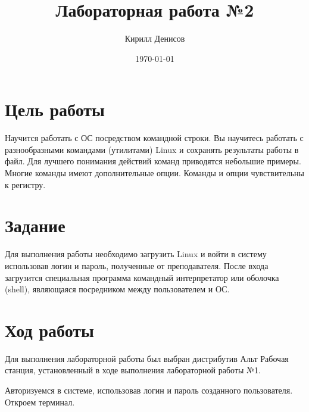 \documentclass[a4paper,14pt]{extarticle}
\author{Кирилл Денисов}
\title{Лабораторная работа №2}
\date{\today}
\newcommand{\pathToCommonFolder}{/home/denilai/Documents/repos/latex/Common}
\begin{document}
	\thispagestyle{empty}
	
	\newpage
	
\normalsize

\section*{Цель работы}
Научится работать с ОС
посредством командной строки. Вы научитесь работать с
разнообразными командами (утилитами) Linux и сохранять
результаты работы в файл. Для лучшего понимания действий
команд приводятся небольшие примеры. Многие команды имеют
дополнительные опции. Команды и опции чувствительны к
регистру.

\section*{Задание}
Для выполнения работы необходимо загрузить Linux и
войти в систему использовав логин и пароль, полученные от
преподавателя. После входа загрузится специальная программа
командный интерпретатор или оболочка (shell), являющаяся
посредником между пользователем и ОС. 


\section*{Ход работы}

Для выполнения лабораторной работы был выбран дистрибутив Альт Рабочая станция, установленный в ходе выполнения лабораторной работы №1. 

Авторизуемся в системе, использовав логин и пароль созданного пользователя. Откроем терминал.
\end{document}
